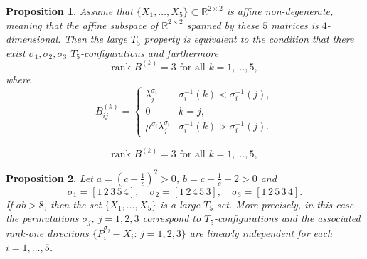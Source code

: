 \documentclass[10pt,a4paper]{amsart}
\newtheorem{proposition}{Proposition}
\newcommand{\R}{\mathbb{R}}
\begin{document}
\begin{proposition} \label{pr:criterion_rank3}  Assume that $\{X_1,\dots,X_5\}\subset\R^{2\times 2}$ is affine non-degenerate, meaning that the affine subspace of $\R^{2\times 2}$ spanned by these $5$ matrices is $4$-dimensional. Then the large $T_5$ property is 
equivalent to the condition that there exist $\sigma_1,\sigma_2,\sigma_3$ $T_5$-configurations and furthermore 
\begin{equation}\label{T5e:rank}
	\textrm{rank }B^{(k)}=3\textrm{ for all }k=1,\dots,5,
\end{equation}
where
$$
B^{(k)}_{ij}=\begin{cases} \lambda_j^{\sigma_i}& \sigma_i^{-1}(k)<\sigma_i^{-1}(j),\\
0&k=j,\\
\mu^{\sigma_i}\lambda_j^{\sigma_i}&	\sigma_i^{-1}(k)>\sigma_i^{-1}(j).\end{cases}
$$
\end{proposition}

\begin{equation}
	\textrm{rank }B^{(k)}=3\textrm{ for all }k=1,\dots,5,
\end{equation}

\begin{proposition}\label{T5p:ex}
Let  $a=(c-\tfrac1c)^2>0$,  $b=c+\tfrac1c-2>0$ and
\begin{equation*}
\sigma_1=[1\, 2\, 3\, 5\, 4],\quad 	\sigma_2=[1\, 2\, 4\, 5\, 3],\quad 	\sigma_3=[1\, 2\, 5\, 3\, 4].
\end{equation*}
If $ab>8$, then the set $\{X_1,\dots,X_5\}$ is a large $T_5$ set. More precisely, in this case the permutations $\sigma_j$, $j=1,2,3$ correspond
to $T_5$-configurations and the associated rank-one directions $\{P_i^{\sigma_j}-X_i:\,j=1,2,3\}$ are linearly independent for each $i=1,\dots,5$.
\end{proposition}
\end{document}
